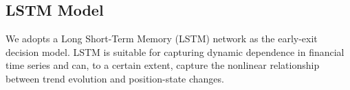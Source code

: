 \documentclass[12pt]{article}
\begin{document}





\subsection{LSTM Model}

We adopts a Long Short-Term Memory (LSTM) network as the early-exit decision model. 
LSTM is suitable for capturing dynamic dependence in financial time series and can, to a 
certain extent, capture the nonlinear relationship between trend evolution and position-state 
changes.
\end{document}
